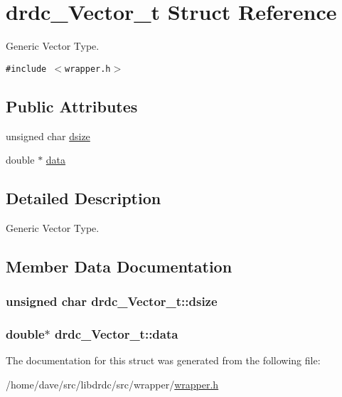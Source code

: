 \hypertarget{structdrdc__Vector__t}{
\section{drdc\_\-Vector\_\-t Struct Reference}
\label{structdrdc__Vector__t}
}
Generic Vector Type.  


{\tt \#include $<$wrapper.h$>$}

\subsection*{Public Attributes}
\begin{CompactItemize}
\item 
unsigned char \hyperlink{structdrdc__Vector__t_8785442000974dbb173a3adb20452833}{dsize}
\item 
double $\ast$ \hyperlink{structdrdc__Vector__t_c5b4198bcd52f33c12f07ff3b998fcac}{data}
\end{CompactItemize}


\subsection{Detailed Description}
Generic Vector Type. 



\subsection{Member Data Documentation}
\hypertarget{structdrdc__Vector__t_8785442000974dbb173a3adb20452833}{
\subsubsection[dsize]{\setlength{\rightskip}{0pt plus 5cm}unsigned char {\bf drdc\_\-Vector\_\-t::dsize}}}
\label{structdrdc__Vector__t_8785442000974dbb173a3adb20452833}


\hypertarget{structdrdc__Vector__t_c5b4198bcd52f33c12f07ff3b998fcac}{
\subsubsection[data]{\setlength{\rightskip}{0pt plus 5cm}double$\ast$ {\bf drdc\_\-Vector\_\-t::data}}}
\label{structdrdc__Vector__t_c5b4198bcd52f33c12f07ff3b998fcac}




The documentation for this struct was generated from the following file:\begin{CompactItemize}
\item 
/home/dave/src/libdrdc/src/wrapper/\hyperlink{wrapper_8h}{wrapper.h}\end{CompactItemize}
